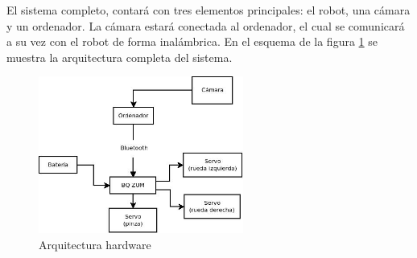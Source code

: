 El sistema completo, contará con tres elementos principales: el robot, una cámara y un ordenador. La cámara estará conectada al ordenador, el cual se comunicará a su vez con el robot de forma inalámbrica. En el esquema de la figura \ref{fig:arquitectura} se muestra la arquitectura completa del sistema.

\begin{figure}[H]
        \centering
        \includegraphics[width=0.6\textwidth]{images/arquitectura.jpg}
        \caption{Arquitectura hardware}
        \label{fig:arquitectura}
\end{figure} 